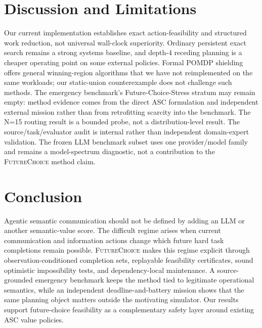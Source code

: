 \documentclass[conference]{IEEEtran}
\newcommand{\futurechoice}{\textsc{FutureChoice}\xspace}
\begin{document}
\section{Discussion and Limitations}
Our current implementation establishes exact action-feasibility and structured work reduction, not universal wall-clock superiority. Ordinary persistent exact search remains a strong systems baseline, and depth-4 receding planning is a cheaper operating point on some external policies. Formal POMDP shielding offers general winning-region algorithms that we have not reimplemented on the same workloads; our static-union counterexample does not challenge such methods. The emergency benchmark's Future-Choice-Stress stratum may remain empty: method evidence comes from the direct ASC formulation and independent external mission rather than from retrofitting scarcity into the benchmark. The N=15 routing result is a bounded probe, not a distribution-level result. The source/task/evaluator audit is internal rather than independent domain-expert validation. The frozen LLM benchmark subset uses one provider/model family and remains a model-spectrum diagnostic, not a contribution to the \futurechoice method claim.

\section{Conclusion}
Agentic semantic communication should not be defined by adding an LLM or another semantic-value score. The difficult regime arises when current communication and information actions change which future hard task completions remain possible. \futurechoice makes this regime explicit through observation-conditioned completion sets, replayable feasibility certificates, sound optimistic impossibility tests, and dependency-local maintenance. A source-grounded emergency benchmark keeps the method tied to legitimate operational semantics, while an independent deadline-and-battery mission shows that the same planning object matters outside the motivating simulator. Our results support future-choice feasibility as a complementary safety layer around existing ASC value policies.





\end{document}

